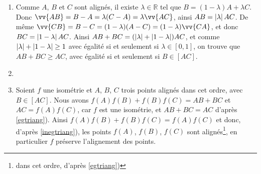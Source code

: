 \documentclass[a4paper,12pt,reqno]{amsart}
\newcommand*{\abs}[1]{\left\lvert{\ifx\hfuzz#1\hfuzz \,\cdot\,\else#1\fi}\right\rvert} %
\begin{document}
\begin{solution}
  \begin{enumerate}
    \item\label{egtriang} Comme $A$, $B$ et $C$ sont alignés, il existe $\lambda \in \mathbb{R}$ tel que $B=(1- \lambda)A + \lambda C$. Donc $\vv{AB} = B - A = \lambda (C-A) = \lambda \vv{AC}$, ainsi $AB = \abs{\lambda} AC$. De même $\vv{CB} = B - C = (1-\lambda)(A-C) = (1-\lambda)\vv{CA}$, et donc $BC=\abs{1- \lambda}AC$. Ainsi $AB+BC = (\abs{\lambda}+\abs{1-\lambda})AC$, et comme $\abs{\lambda}+\abs{1-\lambda} \geq 1$ avec égalité si et seulement si $\lambda \in [0,1]$, on trouve que $AB+BC \geq AC$, avec égalité si et seulement si $B \in [AC]$.
    \item\label{inegtriang}\vspace{-2mm}
    \vspace{3mm}
    \item Soient $f$ une isométrie et $A$, $B$, $C$ trois points alignés dans cet ordre, avec $B \in [AC]$. Nous avons $f(A)f(B) + f(B)f(C) = AB + BC$ et $AC = f(A)f(C)$, car $f$ est une isométrie, et $AB + BC = AC$ d'après \ref{egtriang}). Ainsi $f(A)f(B) + f(B)f(C) = f(A)f(C)$ et donc, d'après \ref{inegtriang}), les points $f(A)$, $f(B)$, $f(C)$ sont alignés\footnote{dans cet ordre, d'après \ref{egtriang})}, en particulier $f$ préserve l'alignement des points.
  \end{enumerate}
\end{solution}

\sisujet{\newpage}
\end{document}
